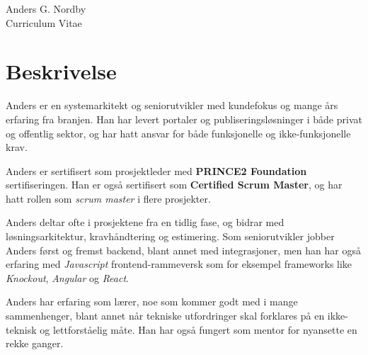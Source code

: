 \documentclass[10pt]{article} %
\begin{document}
\begin{paracol}{2} %


\parbox[top][0.12\textheight][c]{\linewidth}{ %
	\vspace{-0.04\textheight} %
	\centering %
	{\sffamily\Huge Anders G. Nordby}\\\medskip %
	{\Huge\color{headings}\cvtextfont Curriculum Vitae}
}


\section{Beskrivelse}

Anders er en systemarkitekt og seniorutvikler med kundefokus og mange års erfaring fra branjen.
Han har levert portaler og publiseringsløsninger i både privat og offentlig sektor, og har hatt
ansvar for både funksjonelle og ikke-funksjonelle krav.
\medskip

Anders er sertifisert som prosjektleder med \textbf{PRINCE2 Foundation} sertifiseringen. Han er også
sertifisert som \textbf{Certified Scrum Master}, og har hatt rollen som \textit{scrum master} i flere prosjekter.
\medskip

Anders deltar ofte i prosjektene fra en tidlig fase, og bidrar med løsningsarkitektur, kravhåndtering og
estimering. Som seniorutvikler jobber Anders først og fremst backend, blant annet med integrasjoner,
men han har også erfaring med \textit{Javascript} frontend-rammeversk som for eksempel frameworks like \textit{Knockout}, \textit{Angular} og \textit{React}.
\medskip

Anders har erfaring som lærer, noe som kommer godt med i mange sammenhenger, blant annet når tekniske utfordringer
skal forklares på en ikke-teknisk og lettforståelig måte. Han har også fungert som mentor for nyansette en rekke ganger.
\medskip


\end{paracol}
\end{document}
